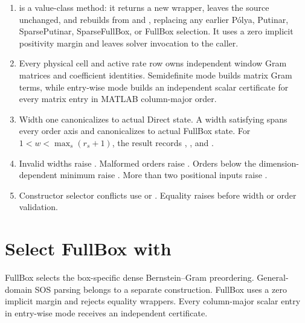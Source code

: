\remarkshead
\begin{enumerate}[leftmargin=*]
  \item {} is a value-class method: it returns a new wrapper, leaves the source unchanged, and rebuilds from  and , replacing any earlier P\'olya, Putinar, SparsePutinar, SparseFullBox, or FullBox selection. It uses a zero implicit positivity margin and leaves solver invocation to the caller.
  \item Every physical cell and active rate row owns independent window Gram matrices and coefficient identities. Semidefinite mode builds matrix Gram terms, while entry-wise mode builds an independent scalar certificate for every matrix entry in MATLAB column-major order.
  \item Width one canonicalizes to actual Direct state. A width satisfying  spans every order axis and canonicalizes to actual FullBox state. For $1<w<\max_s(r_s+1)$, the result records , , and .
  \item Invalid widths raise . Malformed orders raise \allowbreak{}. Orders below the dimension-dependent minimum raise \allowbreak{}. More than two positional inputs raise .
  \item Constructor selector conflicts use \allowbreak{} or . Equality raises \allowbreak{} before width or order validation.
\end{enumerate}

\section[Select FullBox with \texorpdfstring{\codeplain{useFullBox}}{useFullBox}]{%
Select FullBox with\\[-0.15em] \texorpdfstring{}{useFullBox}}
\label{sec:pdlmi-full-box}

FullBox selects the box-specific dense Bernstein--Gram preordering. General-domain SOS parsing belongs to a separate construction. FullBox uses a zero implicit margin and rejects equality wrappers. Every column-major scalar entry in entry-wise mode receives an independent certificate.

